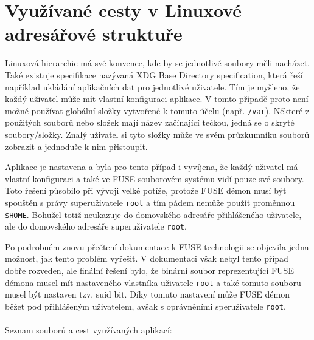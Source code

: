 \section{Využívané cesty v Linuxové adresářové struktuře}

Linuxová hierarchie má své konvence, kde by se jednotlivé soubory měli nacházet. Také existuje specifikace nazývaná XDG Base Directory specification, která
řeší například ukládání aplikačních dat pro jednotlivé uživatele. Tím je myšleno, že každý uživatel může mít vlastní konfiguraci aplikace. V tomto případě proto není
možné používat globální složky vytvořené k tomuto účelu (např. \texttt{/var}). Některé z použitých souborů nebo složek mají název začínající tečkou, jedná se o skryté
soubory/složky. Znalý uživatel si tyto složky může ve svém průzkumníku souborů zobrazit a jednoduše k nim přistoupit.

Aplikace je nastavena a byla pro tento případ i vyvíjena, že každý uživatel má vlastní konfiguraci a také ve FUSE souborovém systému vidí pouze své soubory. Toto řešení
působilo při vývoji velké potíže, protože FUSE démon musí být spouštěn s právy superuživatele \texttt{root} a tím pádem nemůže použít proměnnou \texttt{\$HOME}. Bohužel 
totiž neukazuje do domovského adresáře přihlášeného uživatele, ale do domovského adresáře superuživatele \texttt{root}.

Po podrobném znovu přečtení dokumentace k FUSE technologii se objevila jedna možnost, jak tento problém vyřešit. V dokumentaci však nebyl tento případ dobře rozveden, ale 
finální řešení bylo, že binární soubor reprezentující FUSE démona musel mít nastaveného vlastníka uživatele \texttt{root} a také tomuto souboru musel být nastaven 
tzv. suid bit. Díky tomuto nastavení může FUSE démon běžet pod přihlášeným uživatelem, avšak s oprávněními speruživatele \texttt{root}.
\\\\
\noindent Seznam souborů a cest využívaných aplikací:

